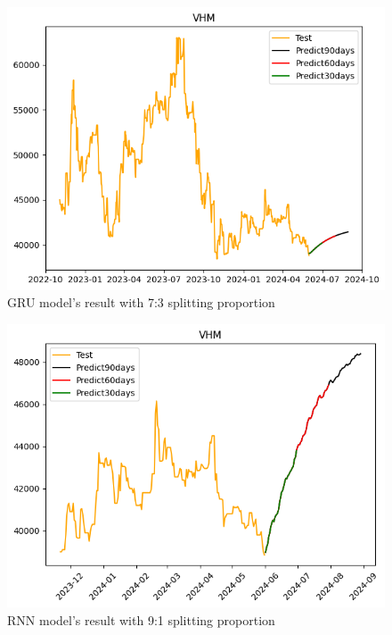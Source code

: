 \documentclass{ieeeojies}
\begin{document}
  \begin{figure}[H]
    \centering
    \begin{minipage}{0.8\linewidth}
      \centering
          \includegraphics[width=\linewidth]{bibliography/Figure/VHMGRU_7-3.png}
      \caption{GRU model’s result with 7:3 splitting proportion}
      \label{fig28}
    \end{minipage}
  \end{figure}
  
  \begin{figure}[H]
    \centering
    \begin{minipage}{0.8\linewidth}
      \centering
          \includegraphics[width=\linewidth]{bibliography/Figure/VHMRNN_9-1.png}
      \caption{RNN model’s result with 9:1 splitting proportion}
      \label{fig28}
    \end{minipage}
  \end{figure}
  
\end{document}
